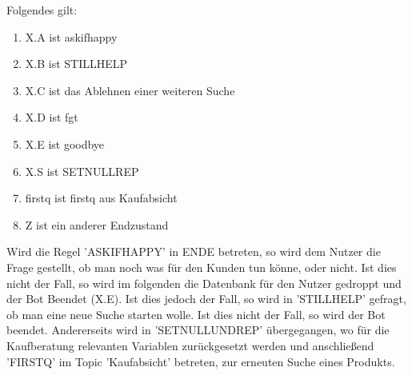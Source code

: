 Folgendes gilt:

\begin{enumerate}
\item{X.A ist askifhappy}
\item{X.B ist STILLHELP}
\item{X.C ist das Ablehnen einer weiteren Suche}
\item{X.D ist fgt}
\item{X.E ist goodbye}
\item{X.S ist SETNULLREP}
\item{firstq ist firstq aus Kaufabsicht}
\item{Z ist ein anderer Endzustand }
\end{enumerate}

Wird die Regel 'ASKIFHAPPY' in ENDE betreten, so wird dem Nutzer die Frage gestellt, ob man noch was für den Kunden tun könne, oder nicht. Ist dies nicht der Fall, so wird im folgenden die Datenbank für den Nutzer gedroppt und der Bot Beendet (X.E). Ist dies jedoch der Fall, so wird in 'STILLHELP' gefragt, ob man eine neue Suche starten wolle. Ist dies nicht der Fall, so wird der Bot beendet. Andererseits wird in 'SETNULLUNDREP' übergegangen, wo für die Kaufberatung relevanten Variablen zurückgesetzt werden und anschließend 'FIRSTQ' im Topic 'Kaufabsicht' betreten, zur erneuten Suche eines Produkts. 

